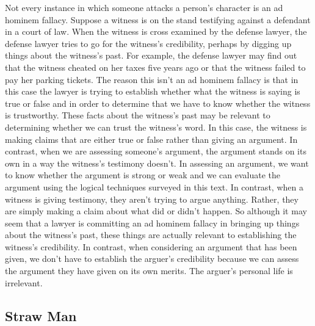 Not every instance in which someone attacks a person's character is an ad hominem fallacy. Suppose a witness is on the stand testifying against a defendant in a court of law. When the witness is cross examined by the defense lawyer, the defense lawyer tries to go for the witness's credibility, perhaps by digging up things about the witness's past. For example, the defense lawyer may find out that the witness cheated on her taxes five years ago or that the witness failed to pay her parking tickets. The reason this isn't an ad hominem fallacy is that in this case the lawyer is trying to establish whether what the witness is saying is true or false and in order to determine that we have to know whether the witness is trustworthy. These facts about the witness's past may be relevant to determining whether we can trust the witness's word. In this case, the witness is making claims that are either true or false rather than giving an argument. In contrast, when we are assessing someone's argument, the argument stands on its own in a way the witness's testimony doesn't. In assessing an argument, we want to know whether the argument is strong or weak and we can evaluate the argument using the logical techniques surveyed in this text. In contrast, when a witness is giving testimony, they aren't trying to argue anything. Rather, they are simply making a claim about what did or didn't happen. So although it may seem that a lawyer is committing an ad hominem fallacy in bringing up things about the witness's past, these things are actually relevant to establishing the witness's credibility. In contrast, when considering an argument that has been given, we don't have to establish the arguer's credibility because we can assess the argument they have given on its own merits. The arguer's personal life is irrelevant.

\subsection{Straw Man}

